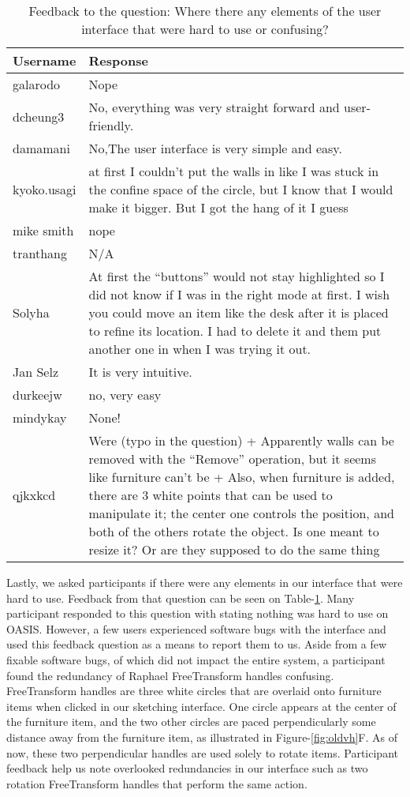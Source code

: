 \begin{table}[h]
\centering
\begin{tabular}{|p{}|p{}|}
\hline
\rowcolor[HTML]{EFEFEF} 
\textbf{Username} & \textbf{Response} \\ \hline
galarodo & Nope \\ \hline
dcheung3 & No, everything was very straight forward and user-friendly. \\ \hline
damamani & No,The user interface is very simple and easy. \\ \hline
kyoko.usagi & at first I couldn't put the walls in like I was stuck in the confine space of the circle, but I know that I would make it bigger. But I got the hang of it I guess \\ \hline
mike smith & nope \\ \hline
tranthang & N/A \\ \hline
Solyha & At first the ``buttons'' would not stay highlighted so I did not know if I was in the right mode at first. I wish you could move an item like the desk after it is placed to refine its location. I had to delete it and them put another one in when I was trying it out. \\ \hline
Jan Selz & It is very intuitive. \\ \hline
durkeejw & no, very easy \\ \hline
mindykay & None! \\ \hline
qjkxkcd & Were (typo in the question) + Apparently walls can be removed with the ``Remove'' operation, but it seems like furniture can't be + Also, when furniture is added, there are 3 white points that can be used to manipulate it; the center one controls the position, and both of the others rotate the object. Is one meant to resize it? Or are they supposed to do the same thing \\ \hline
\end{tabular}
\caption{Feedback to the question: Where there any elements of the user interface that were hard to use or confusing?}
\label{fig:hard2use}
\end{table}


Lastly, we asked participants if there were any elements in our interface that were hard to use.
Feedback from that question can be seen on Table-\ref{fig:hard2use}.
Many participant responded to this question with stating nothing was hard to use on OASIS.
However, a few users experienced software bugs with the interface and used this feedback question as a means to report them to us.
Aside from a few fixable software bugs, of which did not impact the entire system, a participant found the redundancy of Raphael FreeTransform handles confusing.
FreeTransform handles are three white circles that are overlaid onto furniture items when clicked in our sketching interface.
One circle appears at the center of the furniture item, and the two other circles are paced perpendicularly some distance away from the furniture item, as illustrated in Figure-\ref{fig:oldvh}F.
As of now, these two perpendicular handles are used solely to rotate items.
Participant feedback help us note overlooked redundancies in our interface such as two rotation FreeTransform handles that perform the same action.\\

